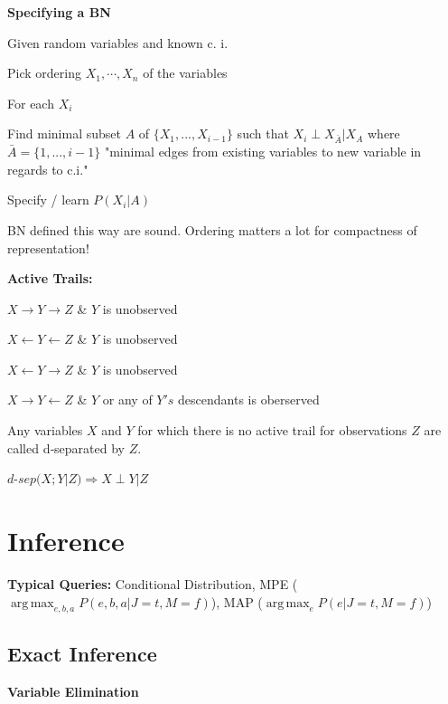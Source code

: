 \documentclass[a4paper, 11pt, landscape]{article}
\DeclareMathOperator*{\argmax}{arg\,max}
\begin{document}
\begin{multicols*}{3}
		\textbf{Specifying a BN}
		\begin{compactitem}
			\item Given random variables and known c. i.
			\item Pick ordering $X_1, \cdots, X_n$ of the variables
			\item For each $X_i$
			\begin{compactenum}
				\item Find minimal subset $A$ of $\{X_1,...,X_{i-1}\}$ such that $X_i \perp X_{\bar{A}} | X_A$ where $\bar{A} = \{1,...,i-1\}$ "minimal edges from existing variables to new variable in regards to c.i."
				\item Specify / learn $P(X_i|A)$
			\end{compactenum}
		\end{compactitem}
		BN defined this way are sound. Ordering matters a lot for compactness of representation!
		
		\textbf{Active Trails:}
		\begin{compactitem}
			\item  $X \rightarrow  Y \rightarrow Z$ \& $Y$ is unobserved
			\item  $X \leftarrow  Y \leftarrow Z$ \& $Y$ is unobserved
			\item  $X \leftarrow  Y \rightarrow Z$ \& $Y$ is unobserved
			\item  $X \rightarrow  Y \leftarrow Z$ \& $Y$ or any of $Y's$ descendants is oberserved
		\end{compactitem}
	
		Any variables $X$ and $Y$ for which there is no active trail for observations $Z$ are called d‐separated by $Z$. 
		
		$d$-$sep(X;Y | Z) \Rightarrow X \perp Y | Z$
		
		\section{Inference}
		\textbf{Typical Queries:} Conditional Distribution, MPE ($\argmax_{e,b,a} P(e,b,a | J=t, M = f)$), MAP ($\argmax_{e} P(e | J=t, M = f)$)
		
		\subsection{Exact Inference}
		
		\textbf{Variable Elimination}
		
		\begin{compactitem}
			

\end{compactitem}
\end{multicols*}
\end{document}
